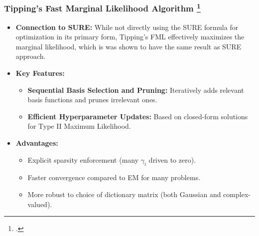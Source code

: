 \documentclass{beamer}
\begin{document}
\begin{frame}
    \frametitle{Tipping's Fast Marginal Likelihood Algorithm \footcite{tipp2003fastsb}}
    \begin{itemize}
        \item \textbf{Connection to SURE:} While not directly using the SURE formula for optimization in its primary form, Tipping's FML effectively maximizes the marginal likelihood, which is was shown to have the same result as SURE approach.
        \item \textbf{Key Features:}
        \begin{itemize}
            \item \textbf{Sequential Basis Selection and Pruning:} Iteratively adds relevant basis functions and prunes irrelevant ones.
            \item \textbf{Efficient Hyperparameter Updates:} Based on closed-form solutions for Type II Maximum Likelihood.
        \end{itemize}
        \item \textbf{Advantages:}
        \begin{itemize}
            \item Explicit sparsity enforcement (many $\gamma_i$ driven to zero).
            \item Faster convergence compared to EM for many problems.
            \item More robust to choice of dictionary matrix (both Gaussian and complex-valued).
        \end{itemize}
    \end{itemize}
\end{frame}
\end{document}
